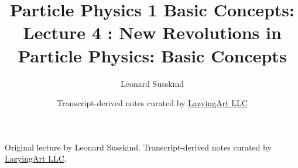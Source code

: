 \documentclass[11pt,oneside]{book}
\begin{document}
\frontmatter
\title{Particle Physics 1 Basic Concepts: Lecture 4 : New Revolutions in Particle Physics: Basic Concepts}
\author{Leonard Susskind}
\date{Transcript-derived notes curated by \href{https://lazying.art}{LazyingArt LLC}}
\maketitle
\begin{center}
\small Original lecture by Leonard Susskind. Transcript-derived notes curated by \href{https://lazying.art}{LazyingArt LLC}.
\end{center}
\clearpage
\mainmatter

\end{document}
